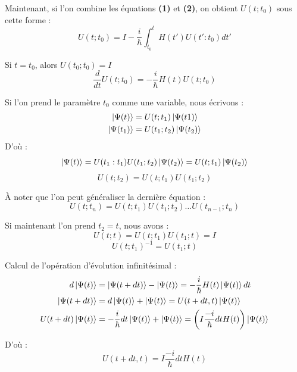 \documentclass[12pt,a4paper,titlepage]{book}
\begin{document}
Maintenant, si l'on combine les équations \textbf{(1)} et \textbf{(2)}, on obtient $U(t ; t_0)$ sous cette forme :
\begin{equation*}
U(t;t_0) = I - \frac{i}{\hbar} \int_{t_0}^{t} H(t') U(t' : t_0) dt'
\end{equation*}

Si $t = t_0$, alors $U (t_0 ; t_0) = I$
\begin{equation*}
\frac{d}{dt} U(t ; t_0) = -\frac{i}{\hbar} H(t) U(t ; t_0)
\end{equation*}

Si l'on prend le paramètre $t_0$ comme une variable, nous écrivons :
\begin{align*}
\ket{\Psi (t)} &= U(t;t_1) \ket{\Psi(t1)}\\
\ket{\Psi (t_1)} &= U(t_1 ; t_2) \ket{\Psi (t_2)}
\end{align*}
D'où :
\begin{equation*}
\ket{\Psi (t)} = U(t_1 : t_1) U(t_1 ; t_2) \ket{\Psi (t_2)} = U(t ; t_1) \ket{\Psi (t_2)}
\end{equation*}
\begin{equation*}
U (t ; t_2) = U (t ; t_1) U (t_1 ; t_2)
\end{equation*}

À noter que l'on peut généraliser la dernière équation :
\begin{equation*}
U(t ; t_n) = U(t ; t_1) U(t_1 ; t_2) \ldots U(t_{n-1} ; t_n)
\end{equation*}

Si maintenant l'on prend $t_2 = t$, nous avons :
\begin{equation*}
U(t ; t) = U(t ; t_1) U(t_1 ; t) = I
\end{equation*}
\begin{equation*}
U(t ; t_1)^{-1} = U(t_1 ; t)
\end{equation*}

Calcul de l'opération d'évolution infinitésimal :
\begin{align*}
d \ket{\Psi (t)} &= \ket{\Psi (t+dt)} - \ket{\Psi (t)} = -\frac{i}{\hbar} H(t) \ket{\Psi (t)} dt\\
\ket{\Psi (t+dt)} &= d \ket{\Psi (t)} + \ket{\Psi (t)} = U(t+dt, t) \ket{\Psi (t)}\\
U(t+dt)\ket{\Psi (t)} &= -\frac{i}{\hbar} dt \ket{\Psi (t)} + \ket{\Psi (t)} = \left( I \frac{-i}{\hbar} dt H(t) \right) \ket{\Psi (t)}
\end{align*}

D'où :
\begin{equation*}
U (t+dt, t) = I \frac{-i}{\hbar} dt H(t)
\end{equation*}
\end{document}
